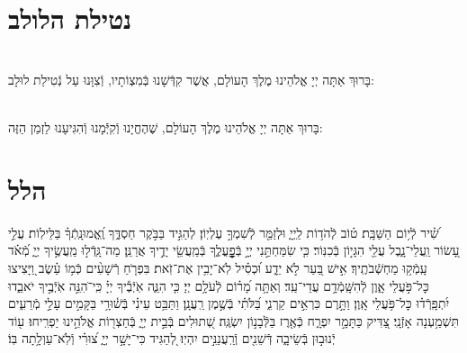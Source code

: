 \documentclass[twoside, openany, parskip=half, 11pt]{book}
\begin{document}
\shabbossimshalom

\tachanunim

\vfill

\\
\\

\clearpage

\section[נטילת הלולב]{ נטילת הלולב }

\\
בָּרוּךְ אַתָּה יְיָ אֱלֹהֵינוּ מֶלֶךְ הָעוֹלָם, אֲשֶׁר קִדְּֿשָׁנוּ בְּֿמִצְוֹתָיו, וְֿצִוָּנוּ עַל נְֿטִילַת לוּלָב:

\vspace{.5\baselineskip}

\\
בָּרוּךְ אַתָּה יְיָ אֱלֹהֵינוּ מֶלֶךְ הָעוֹלָם, שֶׁהֶחֱיָנוּ וְֿקִיְּֿֿמָנוּ וְֿהִגִּיעָנוּ לַזְמַן הַזֶּה:

\section[הלל‎]{ הלל‎ }
\label{sometimes hallel}

\hallel{\chazzan}

\vfill

\label{shabboskaddishtiskabel}
\fullkaddish

\weekdayshir


שִׁ֝֗יר לְֿי֥וֹם הַשַּׁבָּֽת׃
ט֗וֹב לְֿהֹד֥וֹת לַֽיְיָ֑ וּלְזַמֵּ֖ר לְֿשִׁמְךָ֣ עֶלְיֽוֹן׃
לְהַגִּ֣יד בַּבֹּ֣קֶר חַסְדֶּ֑ךָ וֶֽ֝אֱמוּנָֽתְֿךָ֗ בַּלֵּילֽוֹת׃
עֲלֵ֣י עָ֭שׂוֹר וַֽעֲלֵי־נָ֑בֶל עֲלֵ֖י הִגָּי֣וֹן בְּֿכִנּֽוֹר׃
כִּ֤י שִׂמַּחְתַּ֣נִי יְיָ֣ בְּֿפׇׇׇׇׇׇׇׇׇׇׇׇׇׇָֽעֳלֶ֑ךָ בְּֿמַֽעֲשֵׂ֖י יָדֶ֣יךָ אֲרַנֵּֽן׃
מַה־גָּֽדְֿל֣וּ מַֽעֲשֶׂ֣יךָ יְיָ֑ מְֿ֝אֹ֗ד עָֽמְֿק֥וּ מַחְשְֿׁבֹתֶֽיךָ׃
אִ֣ישׁ בַּ֭עַר לֹ֣א יֵדָ֑ע וּ֝כְסִ֗יל לֹֽא־יָבִ֥ין אֶת־זֹֽאת׃
בִּפְרֹ֤חַ רְֿשָׁעִ֨ים כְּֿמ֥וֹ עֵ֗שֶׂב וַ֭יָּצִיצוּ כׇּל־פֹּ֣עֲלֵי אָ֑וֶן לְֿהִשָּֽׁמְֿדָ֥ם עֲדֵי־עַֽד׃
וְאַתָּ֥ה מָ֝ר֗וֹם לְֿעֹלָ֥ם יְיָ׃
כִּ֤י הִנֵּ֢ה אֹֽיְֿבֶ֡יךָ יְיָ֗ כִּֽי־ֹהִנֵּ֣ה אֹֽיְֿבֶ֣יךָ יֹאבֵ֑דוּ יִ֝תְפָּֽרְֿד֗וּ כׇּל־פֹּ֥עֲלֵי אָֽוֶן׃
וַתָּ֣רֶם כִּרְאֵ֣ים קַרְנִ֑י בַּ֝לֹּתִ֗י בְּֿשֶׁ֣מֶן רַֽעֲנָֽן׃
וַתַּבֵּ֥ט עֵינִ֗י בְּֿשׁ֫וּרָ֥י בַּקָּמִ֣ים עָלַ֣י מְֿרֵעִ֑ים תִּשְׁמַ֥עְנָה אָזְֿנָֽי׃
צַ֭דִּיק כַּתָּמָ֣ר יִפְרָ֑ח כְּֿאֶ֖רֶז בַּלְּֿבָנ֣וֹן יִשְׂגֶּֽה׃
שְׁ֭תוּלִים בְּֿבֵ֣ית יְיָ֑ בְּֿחַצְר֖וֹת אֱלֹהֵ֣ינוּ יַפְרִֽיחוּ׃
ע֖וֹד יְֿנוּב֣וּן בְּֿשֵׂיבָ֑ה דְּֿשֵׁנִ֖ים וְֿרַֽעֲנַנִּ֣ים יִהְיֽוּ׃
לְ֭הַגִּיד כִּי־יָשָׁ֣ר יְיָ֑ צ֝וּרִ֗י וְֿלֹֽא־עַוְלָ֥תָה בּֽוֹ׃
\mournerskaddish
\end{document}
